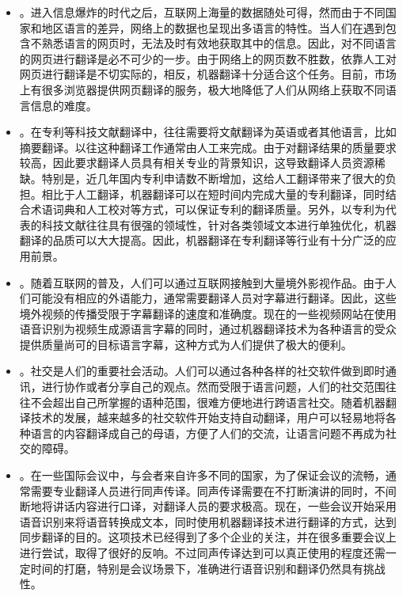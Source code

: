 \begin{itemize} 
\item {\small{}}。进入信息爆炸的时代之后，互联网上海量的数据随处可得，然而由于不同国家和地区语言的差异，网络上的数据也呈现出多语言的特性。当人们在遇到包含不熟悉语言的网页时，无法及时有效地获取其中的信息。因此，对不同语言的网页进行翻译是必不可少的一步。由于网络上的网页数不胜数，依靠人工对网页进行翻译是不切实际的，相反，机器翻译十分适合这个任务。目前，市场上有很多浏览器提供网页翻译的服务，极大地降低了人们从网络上获取不同语言信息的难度。

\item {\small{}}。在专利等科技文献翻译中，往往需要将文献翻译为英语或者其他语言，比如摘要翻译。以往这种翻译工作通常由人工来完成。由于对翻译结果的质量要求较高，因此要求翻译人员具有相关专业的背景知识，这导致翻译人员资源稀缺。特别是，近几年国内专利申请数不断增加，这给人工翻译带来了很大的负担。相比于人工翻译，机器翻译可以在短时间内完成大量的专利翻译，同时结合术语词典和人工校对等方式，可以保证专利的翻译质量。另外，以专利为代表的科技文献往往具有很强的领域性，针对各类领域文本进行单独优化，机器翻译的品质可以大大提高。因此，机器翻译在专利翻译等行业有十分广泛的应用前景。

\item {\small{}}。随着互联网的普及，人们可以通过互联网接触到大量境外影视作品。由于人们可能没有相应的外语能力，通常需要翻译人员对字幕进行翻译。因此，这些境外视频的传播受限于字幕翻译的速度和准确度。现在的一些视频网站在使用语音识别为视频生成源语言字幕的同时，通过机器翻译技术为各种语言的受众提供质量尚可的目标语言字幕，这种方式为人们提供了极大的便利。

\item {\small{}}。社交是人们的重要社会活动。人们可以通过各种各样的社交软件做到即时通讯，进行协作或者分享自己的观点。然而受限于语言问题，人们的社交范围往往不会超出自己所掌握的语种范围，很难方便地进行跨语言社交。随着机器翻译技术的发展，越来越多的社交软件开始支持自动翻译，用户可以轻易地将各种语言的内容翻译成自己的母语，方便了人们的交流，让语言问题不再成为社交的障碍。

\item {\small{}}。在一些国际会议中，与会者来自许多不同的国家，为了保证会议的流畅，通常需要专业翻译人员进行同声传译。同声传译需要在不打断演讲的同时，不间断地将讲话内容进行口译，对翻译人员的要求极高。现在，一些会议开始采用语音识别来将语音转换成文本，同时使用机器翻译技术进行翻译的方式，达到同步翻译的目的。这项技术已经得到了多个企业的关注，并在很多重要会议上进行尝试，取得了很好的反响。不过同声传译达到可以真正使用的程度还需一定时间的打磨，特别是会议场景下，准确进行语音识别和翻译仍然具有挑战性。


\end{itemize}
